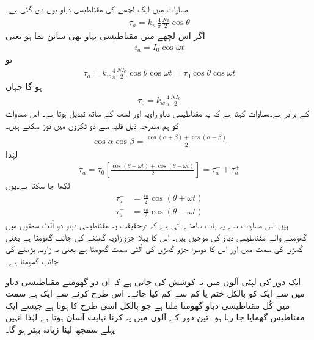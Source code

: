 مساوات   میں ایک لچھے کی مقناطیسی دباو یوں دی گئی ہے۔
\begin{align}
\tau_a=k_w \frac{4}{\pi}\frac{Ni}{2} \cos \theta
\end{align}
 اگر اس لچھے میں مقناطیسی بہاو بھی سائن نما ہو یعنی
\begin{align}
i_a=I_0 \cos \omega t
\end{align}
تو 
\begin{align}\label{مساوات_گھومتے_مشین_دباو_زاویہ_اور_وقت_پر_منحصر}
\tau_a=k_w \frac{4}{\pi} \frac{N I_0}{2} \cos \theta \cos \omega t=\tau_0 \cos \theta \cos \omega t
\end{align}
ہو گا جہاں
\begin{align}
\tau_0=k_w \frac{4}{\pi} \frac{N I_0}{2}
\end{align}
کے برابر ہے۔مساوات   کہتا ہے کہ یہ مقناطیسی دباو زاویہ  اور لمحہ  کے ساتھ تبدیل ہوتا ہے۔ اس مساوات کو ہم مندرجہ ذیل قلیہ سے دو ٹکڑوں میں توڑ سکتے ہیں۔
\begin{align*}
\cos \alpha \cos \beta =\frac{\cos (\alpha +\beta) +\cos (\alpha -\beta)}{2}
\end{align*}
لہٰذا
\begin{align}
\tau_a=\tau_0 \left [\frac{\cos (\theta +\omega t) +\cos (\theta -\omega t)}{2}\right]=\tau_a^{-}+\tau_a^{+}
\end{align}
لکھا جا سکتا ہے۔یوں
\begin{align}
\tau_a^{-}&=\frac{\tau_0}{2} \cos (\theta +\omega t)\\
\tau_a^{+}&=\frac{\tau_0}{2} \cos (\theta -\omega t)
\end{align}
ہیں۔اس مساوات سے یہ بات سامنے آتی ہے کہ درحقیقت یہ مقناطیسی دباو دو اُلٹ سمتوں میں گھومنے والے مقناطیسی دباو کی موجیں ہیں۔ اس کا پہلا جزو  زاویہ  گھٹنے کی جانب گھومتا ہے یعنی گھڑی کی سمت میں اور اس کا دوسرا جزو  گھڑی کی اُلٹی سمت گھومتا ہے یعنی یہ زاویہ بڑھنے کی جانب گھومتا ہے۔

ایک دور کی لپٹی آلوں میں یہ کوشش کی جاتی ہے کہ ان دو گھومتے مقناطیسی دباو میں سے ایک کو بالکل ختم یا کم سے کم کیا جائے۔ اس طرح کرنے سے ایک ہے سمت میں کُل مقناطیسی دباو گھومتا ملتا ہے جو بالکل اسی طرح کا ہوتا ہے جیسے ایک مقناطیس گھمایا جا رہا ہو۔ تین دور کے آلوں میں یہ کرنا نہایت آسان ہوتا ہے لہٰذا انہیں پہلے سمجھ لینا زیادہ بہتر ہو گا۔

